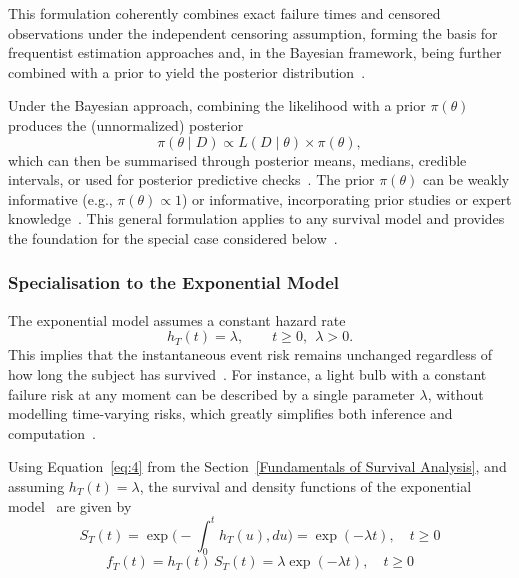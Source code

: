 This formulation coherently combines exact failure times and censored observations under the independent censoring assumption, forming the basis for frequentist estimation approaches and, in the Bayesian framework, being further combined with a prior to yield the posterior distribution~\cite{kalbfleisch2002statistical}.

Under the Bayesian approach, combining the likelihood with a prior $\pi(\theta)$ produces the (unnormalized) posterior
\begin{equation}
\pi(\theta \mid D)
\propto
L(D \mid \theta)\times \pi(\theta),
\end{equation}
which can then be summarised through posterior means, medians, credible intervals, or used for posterior predictive checks~\cite{ibrahim2013bayesian}. The prior $\pi(\theta)$ can be weakly informative (e.g., $\pi(\theta) \propto 1$) or informative, incorporating prior studies or expert knowledge~\cite{carlin1997bayes}. This general formulation applies to any survival model and provides the foundation for the special case considered below~\cite{bernardo1994bayesian}.

\subsubsection{Specialisation to the Exponential Model}
\label{指数模型贝叶斯推断过程}
The exponential model assumes a constant hazard rate
\begin{equation}
h_T(t)=\lambda,\qquad t\ge 0,\ \ \lambda>0 .
\end{equation}
This implies that the instantaneous event risk remains unchanged regardless of how long the subject has survived~\cite{lawless2011statistical, ibrahim2013bayesian}. For instance, a light bulb with a constant failure risk at any moment can be described by a single parameter $\lambda$, without modelling time-varying risks, which greatly simplifies both inference and computation~\cite{lawless2011statistical}.

Using Equation~\eqref{eq:4} from the Section~\ref{Fundamentals of Survival Analysis}, and assuming $h_T(t) = \lambda$, the survival and density functions of the exponential model~\cite{kleinbaum1996survival} are given by
\begin{equation}
    S_T(t) = \exp\Big( -\displaystyle\int_0^t h_T(u), du \Big)=\exp(-\lambda t), \quad t \ge 0
    \label{St_exp}
\end{equation}
\begin{equation}
    f_T(t) = h_T(t)\, S_T(t)=\lambda \exp(-\lambda t), \quad t \ge 0
    \label{ft_exp}
\end{equation}

